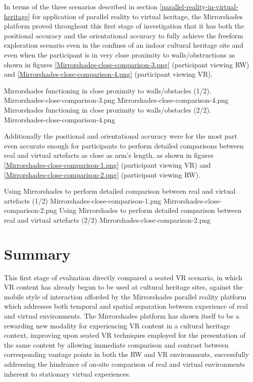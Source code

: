 In terms of the three scenarios described in section \ref{parallel-reality-in-virtual-heritage} for application of parallel reality to virtual heritage, the Mirrorshades platform proved throughout this first stage of investigation that it has both the positional accuracy and the orientational accuracy to fully achieve the freeform exploration scenario even in the confines of an indoor cultural heritage site and even when the participant is in very close proximity to walls/obstructions as shown in figures \ref{Mirrorshades-close-comparison-3.png} (participant viewing RW) and \ref{Mirrorshades-close-comparison-4.png} (participant viewing VR).

 {Mirrorshades functioning in close proximity to walls/obstacles (1/2).} {Mirrorshades-close-comparison-3.png}
       {Mirrorshades-close-comparison-4.png} {Mirrorshades functioning in close proximity to walls/obstacles (2/2).} {Mirrorshades-close-comparison-4.png}

Additionally the positional and orientational accuracy were for the most part even accurate enough for participants to perform detailed comparisons between real and virtual artefacts as close as arm's length, as shown in figures \ref{Mirrorshades-close-comparison-1.png} (participant viewing VR) and \ref{Mirrorshades-close-comparison-2.png} (participant viewing RW).

 {Using Mirrorshades to perform detailed comparison between real and virtual artefacts (1/2)} {Mirrorshades-close-comparison-1.png}
       {Mirrorshades-close-comparison-2.png} {Using Mirrorshades to perform detailed comparison between real and virtual artefacts (2/2)} {Mirrorshades-close-comparison-2.png}


\section{Summary}

This first stage of evaluation directly compared a seated VR scenario, in which VR content has already begun to be used at cultural heritage sites, against the mobile style of interaction afforded by the Mirrorshades parallel reality platform which addresses both temporal and spatial separation between experience of real and virtual environments. The Mirrorshades platform has shown itself to be a rewarding new modality for experiencing VR content in a cultural heritage context, improving upon seated VR techniques employed for the presentation of the same content by allowing immediate comparison and contrast between corresponding vantage points in both the RW and VR environments, successfully addressing the hindrance of on-site comparison of real and virtual environments inherent to stationary virtual experiences.


